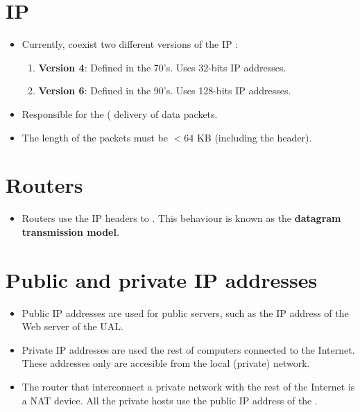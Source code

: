 \section{\gls{IP}}
\begin{itemize}
\item Currently, coexist two different versions of the IP
  \cite{wikipedia_IP}:
  \begin{enumerate}
  \item \textbf{Version 4}: Defined in the 70's. Uses 32-bits IP addresses.
  \item \textbf{Version 6}: Defined in the 90's. Uses 128-bits IP addresses.
  \end{enumerate}
\item Responsible for the ( delivery of data packets.
\item The length of the packets must be $<6$4 KB (including the header).
\end{itemize}

\section{Routers}
\begin{itemize} 
\item Routers use the IP headers to . This behaviour is known as the \textbf{datagram
    transmission model}.
\end{itemize}

\section{Public and private IP addresses}
\begin{itemize}
\item Public IP addresses are used for public servers, such as the IP
  address of the Web server of the UAL.
\item Private IP addresses are used the rest of computers connected to
  the Internet. These addresses only are accesible from the local
  (private) network.
\item The router that interconnect a private network with the rest of
  the Internet is a \gls{NAT} device. All the private hosts use the
  public IP address of the .
\end{itemize}

